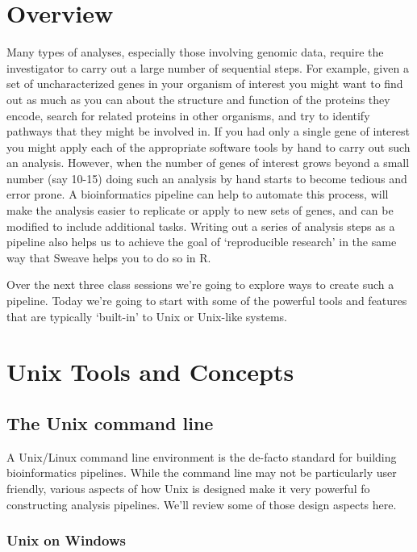 
 
\section*{Overview}

Many types of analyses, especially those involving genomic data, require the investigator to carry out a large number of sequential steps. For example, given a set of uncharacterized genes in your organism of interest you might want to find out as much as you can about the structure and function of the proteins they encode, search for related proteins in other organisms, and try to identify pathways that they might be involved in. If you had only a single gene of interest you might apply each of the appropriate software tools by hand to carry out such an analysis. However, when the number of genes of interest grows beyond a small number (say 10-15) doing such an analysis by hand starts to become tedious and error prone.  A bioinformatics pipeline can help to automate this process, will make the analysis easier to replicate or apply to new sets of genes, and can be modified to include additional tasks.  Writing out a series of analysis steps as a pipeline also helps us to achieve the goal of `reproducible research' in the same way that Sweave helps you to do so in R.

Over the next three class sessions we're going to explore ways to create such a pipeline. Today we're going to start with some of the powerful tools and features that are typically `built-in' to Unix or Unix-like systems.

\section*{Unix Tools and Concepts}

\subsection*{The Unix command line}

A Unix/Linux command line environment is the de-facto standard for building bioinformatics pipelines. While the command line may not be particularly user friendly, various aspects of how Unix is designed make it very powerful fo constructing analysis pipelines.  We'll review some of those design aspects here.


\subsubsection*{Unix on Windows}

